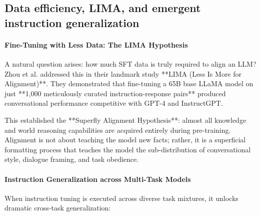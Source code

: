 \documentclass[../../main.tex]{subfiles}
\begin{document}
\subsection{Data efficiency, LIMA, and emergent instruction generalization}
\label{subsec:data_efficiency_emergence_t0_flan}

\paragraph{Fine-Tuning with Less Data: The LIMA Hypothesis}
A natural question arises: how much SFT data is truly required to align an LLM? Zhou et al. \citep{zhou2024lima} addressed this in their landmark study **LIMA (Less Is More for Alignment)**. They demonstrated that fine-tuning a 65B base LLaMA model on just **1,000 meticulously curated instruction-response pairs** produced conversational performance competitive with GPT-4 and InstructGPT.

This established the **Superfly Alignment Hypothesis**: almost all knowledge and world reasoning capabilities are acquired entirely during pre-training. Alignment is not about teaching the model new facts; rather, it is a superficial formatting process that teaches the model the sub-distribution of conversational style, dialogue framing, and task obedience.

\paragraph{Instruction Generalization across Multi-Task Models}
When instruction tuning is executed across diverse task mixtures, it unlocks dramatic cross-task generalization:
\end{document}
